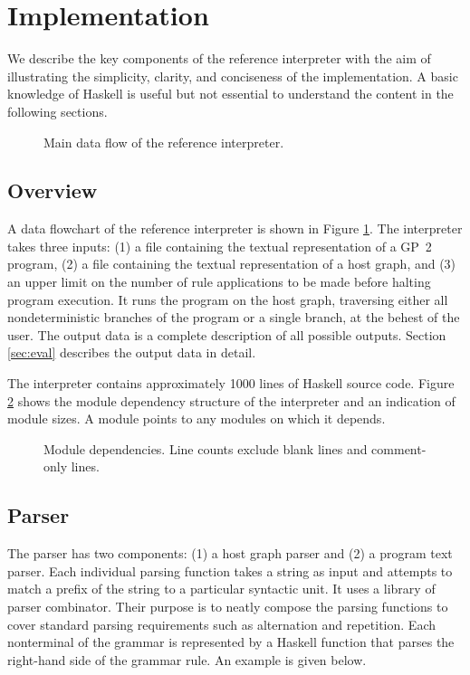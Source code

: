 \section{Implementation}
\label{sec:implementation}
We describe the key components of the reference interpreter with the aim of illustrating the simplicity, clarity, and conciseness of the implementation. A basic knowledge of Haskell is useful but not essential to understand the content in the following sections. 

\begin{figure}
\centering

\caption{Main data flow of the reference interpreter.} \label{fig:architecture}
\end{figure}

\subsection{Overview}
A data flowchart of the reference interpreter is shown in Figure \ref{fig:architecture}. The interpreter takes three inputs: (1) a file containing the textual representation of a GP~2 program, (2) a file containing the textual representation of a host graph, and (3) an upper limit on the number of rule applications to be made before halting program execution. It runs the program on the host graph, traversing either all nondeterministic branches of the program or a single branch, at the behest of the user. The output data is a complete description of all possible outputs. Section \ref{sec:eval} describes the output data in detail.

The interpreter contains approximately 1000 lines of Haskell source code. Figure \ref{fig:modules} shows the module dependency structure of the interpreter and an indication of module sizes. A module points to any modules on which it depends. 

\begin{figure}
\centering

\caption{Module dependencies. Line counts exclude blank lines and comment-only lines.} \label{fig:modules}
\end{figure}

\subsection{Parser}
The parser has two components: (1) a host graph parser and (2) a program text parser. Each individual parsing function takes a string as input and attempts to match a prefix of the string to a particular syntactic unit. It uses a library of parser combinator. Their purpose is to neatly compose the parsing functions to cover standard parsing requirements such as alternation and repetition. Each nonterminal of the grammar is represented by a Haskell function that parses the right-hand side of the grammar rule. An example is given below.

